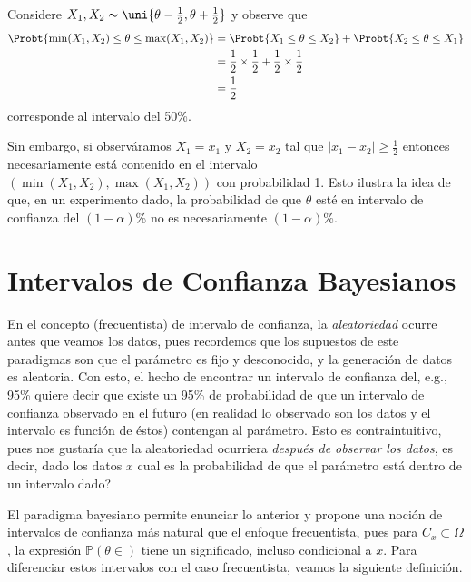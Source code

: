 \begin{example}
\label{eq:unif_int_conf}Considere $X_1,X_2\sim\uni{\theta-\tfrac{1}{2},\theta+\tfrac{1}{2}}$ y observe que 
\begin{align*}
	\Probt{\min(X_1,X_2) \leq \theta \leq \max(X_1,X_2)} 
		&= \Probt{ X_1 \leq \theta \leq X_2}  + \Probt{ X_2 \leq \theta \leq X_1} \\
		&= \frac{1}{2}\times \frac{1}{2} + \frac{1}{2}\times\frac{1}{2}\\
		&= \frac{1}{2}
\end{align*}
corresponde al intervalo del 50\%. 

Sin embargo, si observáramos $X_1 = x_1$ y $X_2 = x_2$ tal que $|x_1-x_2|\geq\tfrac{1}{2}$ entonces necesariamente está contenido en el intervalo $(\min(X_1,X_2) , \max(X_1,X_2))$ con probabilidad 1. Esto ilustra la idea de que, en un experimento dado, la probabilidad de que $\theta$ esté en intervalo de confianza del $(1-\alpha)$\% no es necesariamente $(1-\alpha)$\%.
\end{example}

\section{Intervalos de Confianza Bayesianos}

En el concepto (frecuentista) de intervalo de confianza, la  \emph{aleatoriedad} ocurre antes que veamos los datos, pues recordemos que los supuestos de este paradigmas son que el parámetro es fijo y desconocido, y la generación de datos es aleatoria. Con esto, el hecho de encontrar un intervalo de confianza del, e.g., 95\% quiere decir que existe un 95\% de probabilidad de que un intervalo de confianza observado en el futuro (en realidad lo observado son los datos y el intervalo es función de éstos) contengan al parámetro. Esto es contraintuitivo, pues nos gustaría que la {aleatoriedad} ocurriera \emph{después de observar los datos}, es decir, dado los datos $x$ cual es la probabilidad de que el parámetro está dentro de un intervalo dado?

El paradigma bayesiano permite enunciar lo anterior y propone una noción de intervalos de confianza más natural que el enfoque frecuentista, pues para $ C_x\subset \Omega$, la expresión $\mathbb{P}(\theta \in)$ tiene un significado, incluso condicional a $x$. Para diferenciar estos intervalos con el caso frecuentista, veamos la siguiente definición. 

